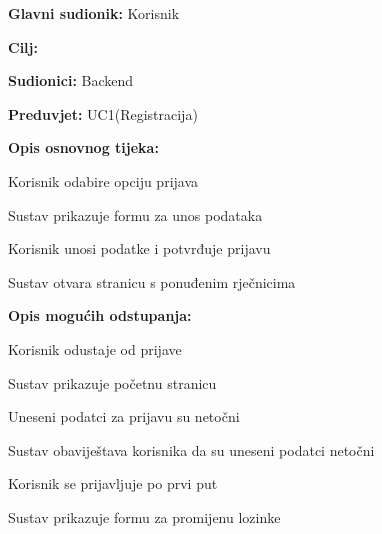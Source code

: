 					
					\noindent {}
					\begin{packed_item}
						
						\item \textbf{Glavni sudionik: } Korisnik
						\item  \textbf{Cilj:} 
						\item  \textbf{Sudionici:} Backend
						\item  \textbf{Preduvjet:} UC1(Registracija)
						\item  \textbf{Opis osnovnog tijeka:}
						
						\item[] \begin{packed_enum}
							
							\item Korisnik odabire opciju prijava
							\item Sustav prikazuje formu za unos podataka
							\item Korisnik unosi podatke i potvrđuje prijavu
							\item Sustav otvara stranicu s ponuđenim rječnicima 
						\end{packed_enum}
						
						\item  \textbf{Opis mogućih odstupanja:}
						
						\item[] \begin{packed_item}
							
							\item[3.a] Korisnik odustaje od prijave
							\item[] \begin{packed_enum}
								
								\item Sustav prikazuje početnu stranicu
								
							\end{packed_enum}
							
							\item[3.b] Uneseni podatci za prijavu su netočni
							\item[] \begin{packed_enum}
								
								\item Sustav obaviještava korisnika da su uneseni podatci netočni
								
							\end{packed_enum}
							
							\item[3.c] Korisnik se prijavljuje po prvi put
							\item[] \begin{packed_enum}
								
								\item Sustav prikazuje formu za promijenu lozinke
								
							\end{packed_enum}
							
							
						\end{packed_item}
					\end{packed_item}
					
